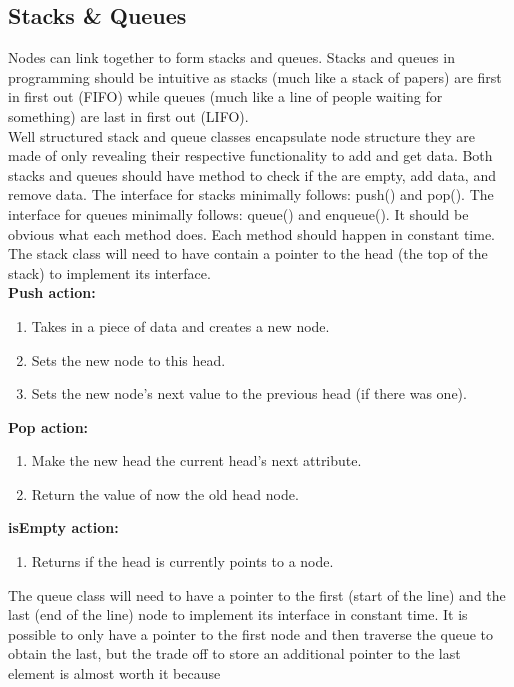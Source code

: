 \documentclass[letterpaper, 10pt]{article}
\begin{document}
\subsection{Stacks \& Queues}
Nodes can link together to form stacks and queues.
Stacks and queues in programming should be intuitive as stacks (much like a stack of papers)
are first in first out (FIFO) while queues (much like a line of people waiting for something) are last in first out (LIFO).\\
\newline
Well structured stack and queue classes encapsulate node structure they are made of only revealing their 
respective functionality to add and get data. Both stacks and queues should have method to check if the are empty, add data, and remove data.
The interface for stacks minimally follows: push() and pop(). The interface for queues minimally follows:
queue() and enqueue(). It should be obvious what each method does. Each method should happen in constant time. \\
\hfill \break \newline
The stack class will need to have contain a pointer to the head (the top of the stack) to implement its interface.\\
\textbf{Push action:}
\begin{enumerate}
    \item Takes in a piece of data and creates a new node.
    \item Sets the new node to this head.
    \item Sets the new node's next value to the previous head (if there was one).
\end{enumerate}
\textbf{Pop action:}
\begin{enumerate}
    \item Make the new head the current head's next attribute.
    \item Return the value of now the old head node.
\end{enumerate}
\textbf{isEmpty action:}
\begin{enumerate}
    \item Returns if the head is currently points to a node.
\end{enumerate}
The queue class will need to have a pointer to the first (start of the line) and the last (end of the line) node
to implement its interface in constant time. It is possible to only have a pointer to the first node and then traverse
the queue to obtain the last, but the trade off to store an additional pointer to the last element is almost worth it because
\end{document}
